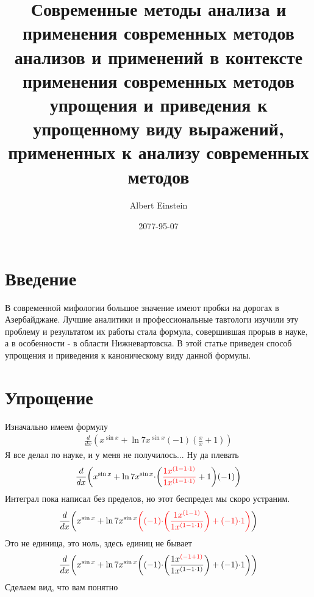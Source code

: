 \documentclass{article}
\title{Современные методы анализа и применения современных методов анализов и применений в контексте применения современных методов упрощения и приведения к упрощенному виду выражений, примененных к анализу современных методов}
\date{2077-95-07}
\author{Albert Einstein}
\begin{document}
\maketitle
\newpage
\allowdisplaybreaks
\section{Введение}В современной мифологии большое значение имеют пробки на дорогах в Азербайджане. Лучшие аналитики и профессиональные тавтологи изучили эту проблему и результатом их работы стала формула, совершившая прорыв в науке, а в особенности - в области Нижневартовска. В этой статье приведен способ упрощения и приведения к каноническому виду данной формулы.\section{Упрощение}\begin{center}Изначально имеем формулу\begin{gather*}
{{\frac{{d}}{{d{{x}}}}}{{\left({{x}^{\sin{{x}}}}+{{{{\ln{{7}}}{{x}^{\sin{{x}}}}}{\left(-{1}\right)}}{\left({\frac{{x}}{{x}}}+{1}\right)}}\right)}}}\end{gather*}
Я все делал по науке, и у меня не получилось... Ну да плевать\begin{gather*}
{{\frac{{d}}{{d{{x}}}}}{{\left({{x}^{\sin{{x}}}}+{{\ln{{7}}}{{{x}^{\sin{{x}}}}{\cdot}{{\left({\color{red}{{\frac{{{1}{{x}^{\left({1}-{{1}{\cdot}{1}}\right)}}}}{{{1}{{x}^{\left({1}-{{1}{\cdot}{1}}\right)}}}}}}}+{1}\right)}{\left(-{1}\right)}}}}\right)}}}\end{gather*}
Интеграл пока написал без пределов, но этот беспредел мы скоро устраним.\begin{gather*}
{{\frac{{d}}{{d{{x}}}}}{{\left({{x}^{\sin{{x}}}}+{{\ln{{7}}}{{{x}^{\sin{{x}}}}{\color{red}{{\left({{\left(-{1}\right)}{\cdot}{\left(\frac{{{1}{{x}^{\left({1}-{1}\right)}}}}{{{1}{{x}^{\left({1}-{{1}{\cdot}{1}}\right)}}}}\right)}}+{{\left(-{1}\right)}{\cdot}{1}}\right)}}}}}\right)}}}\end{gather*}
Это не единица, это ноль, здесь единиц не бывает\begin{gather*}
{{\frac{{d}}{{d{{x}}}}}{{\left({{x}^{\sin{{x}}}}+{{\ln{{7}}}{{{x}^{\sin{{x}}}}{\left({{\left(-{1}\right)}{\cdot}{\left(\frac{{{1}{{x}^{\color{red}{{\left({-{1}}+{1}\right)}}}}}}{{{1}{{x}^{\left({1}-{{1}{\cdot}{1}}\right)}}}}\right)}}+{{\left(-{1}\right)}{\cdot}{1}}\right)}}}\right)}}}\end{gather*}
Сделаем вид, что вам понятно\begin{gather*}

\end{gather*}
\end{center}
\end{document}
